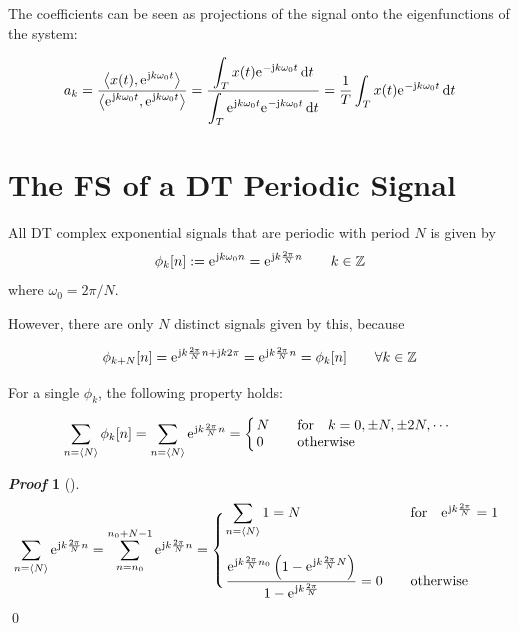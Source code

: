 \documentclass[10pt,UTF8]{article}
\makeatletter
\newenvironment{definition box}
{\begin{tcolorbox}[colback=blue!5!white,colframe=blue!75!black,parbox=false,before upper=\par,before lower=\par]}
{\end{tcolorbox}}
\newenvironment{theorem box}
{\begin{tcolorbox}[colback=yellow!5!white,colframe=yellow!75!black,parbox=false,before upper=\par,before lower=\par]}
{\end{tcolorbox}}
\theoremstyle{definition}
\newtheorem{definition inner}{Definition}[section]
\theoremstyle{plain}
\newtheorem{theorem inner}{Theorem}[section]
\theoremstyle{definition}
\newtheorem*{proof inner}{\textit{Proof}}
\renewenvironment{proof}[1][]
{\begin{proof inner}[#1]\hfill\par}
{\qed\end{proof inner}}
\theoremstyle{remark}
\newcommand{\mycases}[2][0.8]{
    \left\{\vphantom{\scalebox{#1}{
        $\begin{matrix}#2\end{matrix}$
    }}\right.\!\!\!\!
    \begin{array}{l@{\quad}l}#2\end{array}
}
\newcommand{\ju}{\mathrm{j}}  %
\newcommand{\e}{\mathrm{e}{\mkern 1 mu}}
\makeatother
\begin{document}
The coefficients can be seen as projections of the signal onto the
eigenfunctions of the system:
\begin{theorem box}
\begin{equation*}
    a_k = \frac{\displaystyle\left<x(t), \e^{\ju k \omega_0 t}\right>}
    {\displaystyle\left<\e^{\ju k \omega_0 t}, \e^{\ju k \omega_0 t}\right>} =
    \frac{\displaystyle\int_T x(t) \e^{-\ju k\omega_0 t} \dd{t}}
    {\displaystyle\int_T \e^{\ju k \omega_0 t} \e^{-\ju k\omega_0 t} \dd{t}}
    = \frac{1}{T} \int_T x(t) \e^{-\ju k\omega_0 t} \dd{t}
\end{equation*}
\end{theorem box}

\section{The FS of a DT Periodic Signal}

All DT complex exponential
signals that are periodic with period $N$ is given by
\begin{equation*}
    \phi_k[n] := \e^{\ju k \omega_0 n} = \e^{\ju k \frac{2\pi}{N} n}
    \qquad k \in \mathbb{Z}
\end{equation*}
where $\omega_0 = 2\pi/N$.

However, there are only $N$ distinct signals given by this, because
\begin{theorem box}
    \begin{equation*}
        \phi_{k+N}[n] = \e^{\ju k \frac{2\pi}{N} n + \ju k 2\pi}
        = \e^{\ju k \frac{2\pi}{N} n} = \phi_k[n]
        \qquad \forall k \in \mathbb{Z}
    \end{equation*}
\end{theorem box}

For a single $\phi_k$, the following property holds:
\begin{theorem box}
    \begin{equation*}
        \sum_{n=\langle N\rangle} \phi_k[n] = 
        \sum_{n=\langle N\rangle} \e^{\ju k \frac{2\pi}{N} n} = 
        \mycases{
            N & \qfor k=0,\pm N, \pm 2N, \cdots \\
            0 & \qotherwise
        }
    \end{equation*}
\end{theorem box}
\begin{proof}
    \begin{equation*}
        \sum_{n=\langle N\rangle} \e^{\ju k \frac{2\pi}{N} n}
        = \sum_{n=n_0}^{n_0+N-1} \e^{\ju k \frac{2\pi}{N} n}
        = \mycases{
            \displaystyle
            \sum_{n=\langle N\rangle} 1
            = N & \qfor \e^{\ju k \frac{2\pi}{N}}=1 \\\\
            \displaystyle
            \frac{\displaystyle \e^{\ju k \frac{2\pi}{N} n_0}\left(
                1-\e^{\ju k \frac{2\pi}{N}N}\right)}
            {\displaystyle 1-\e^{\ju k \frac{2\pi}{N}}}
            = 0 & \qotherwise
        }
    \end{equation*}
\end{proof}
\end{document}
